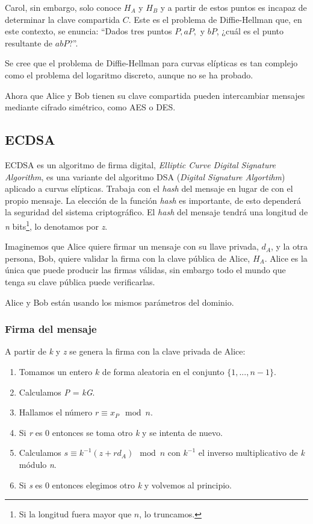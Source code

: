 \documentclass[11pt]{article}
\begin{document}
Carol, sin embargo, solo conoce $H_A$ y $H_B$ y a partir de estos puntos es incapaz de determinar la clave compartida $C$. Este es el problema de Diffie-Hellman que, en este contexto, se enuncia:
  ``Dados tres puntos $P, aP,$ y $bP$, ¿cuál es el punto resultante de $abP$?''.

Se cree que el problema de Diffie-Hellman para curvas elípticas es tan complejo como el problema del logaritmo discreto, aunque no se ha probado.

Ahora que Alice y Bob tienen su clave compartida pueden intercambiar mensajes mediante cifrado simétrico, como AES o DES.

\subsection{ECDSA}

ECDSA es un algoritmo de firma digital, \textit{Elliptic Curve Digital Signature Algorithm}, es una variante del algoritmo DSA (\textit{Digital Signature Algortihm}) aplicado a curvas elípticas. Trabaja con el \textit{hash} del mensaje en lugar de con el propio mensaje. La elección de la función \textit{hash} es importante, de esto dependerá la seguridad del sistema criptográfico. El \textit{hash} del mensaje tendrá una longitud de \textit{n} bits\footnote{Si la longitud fuera mayor que $n$, lo truncamos.}, lo denotamos por \textit{z}.

Imaginemos que Alice quiere firmar un mensaje con su llave privada, $d_{A}$, y la otra persona, Bob, quiere validar la firma con la clave pública de Alice, $H_{A}$. Alice es la única que puede producir las firmas válidas, sin embargo todo el mundo que tenga su clave pública puede verificarlas.

Alice y Bob están usando los mismos parámetros del dominio.

\subsubsection*{Firma del mensaje}
A partir de \textit{k} y \textit{z} se genera la firma con la clave privada de Alice:

\begin{enumerate}
	\item Tomamos un entero $ k $ de forma aleatoria en el conjunto $ \{ 1, ..., n-1\} $.
	\item Calculamos \textit{P} = \textit{kG}.
	\item Hallamos el número \textit{$r \equiv x_{P} \mod n$}.
	\item Si \textit{r} es 0 entonces se toma otro \textit{k} y se intenta de nuevo.
	\item Calculamos $s \equiv k^{-1}(z + rd_{A}) \mod n$  con \textit{$k^{-1}$} el inverso multiplicativo de \textit{k} módulo \textit{n}.
	\item Si \textit{s} es 0 entonces elegimos otro \textit{k} y volvemos al principio.
\end{enumerate} 
\end{document}
